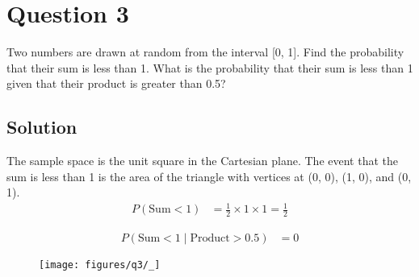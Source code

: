 \section*{Question 3}

Two numbers are drawn at random from the interval [0, 1].
Find the probability that their sum is less than 1.
What is the probability that their sum is less than 1 given that their product is greater than 0.5?

\subsection*{Solution}

The sample space is the unit square in the Cartesian plane.
The event that the sum is less than 1 is the area of the triangle with vertices at (0, 0), (1, 0), and (0, 1).
\begin{align*}
    P(\text{Sum} < 1)
     & =
    \frac{1}{2} \times 1 \times 1
    = \boxed{\frac{1}{2}}
\end{align*}

\begin{align*}
    P(\text{Sum} < 1 \mid \text{Product} > 0.5)
     & =
    \boxed{0}
\end{align*}

\begin{figure}[hb]
    \centering
    \texttt{[image: figures/q3/\_]}
\end{figure}
